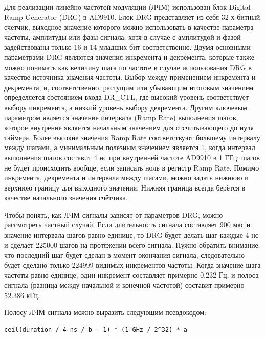 \documentclass[rusmathsym, eqnumwithinsec, amspack, hyperref]{bomgost}
\begin{document}
Для реализации линейно-частотой модуляции (ЛЧМ) использован блок Digital Ramp Generator (DRG) в AD9910. Блок DRG представляет из себя 32-х битный счётчик, выходное значение которого можно использовать в качестве параметра частоты, амплитуды или фазы сигнала, хотя в случае с амплитудой и фазой задействованы только 16 и 14 младших бит соответственно. Двумя основными параметрами DRG являются значения инкремента и декремента, которые также можно понимать как величину шага по частоте в случае использования DRG в качестве источника значения частоты. Выбор между применением инкремента и декремента, и, соответственно, растущим или убывающим итоговым значением определяется состоянием входа DR\_CTL, где высокий уровень соответствует выбору инкремента, а низкий уровень выбору декремента. Другим ключевым параметром является значение интервала (Ramp Rate) выполнения шагов, которое внутренне является начальным значением для отсчитывающего до нуля таймера. Более высокие значения Ramp Rate соответствуют большему интервалу между шагами, а минимальным полезным значением является 1, когда интервал выполнения шагов составит 4 нс при внутренней частоте AD9910 в 1 ГГц; шагов не будет происходить вообще, если записать ноль в регистр Ramp Rate. Помимо инкремента, декремента и интервала между шагами, можно задать нижнюю и верхнюю границу для выходного значения. Нижняя граница всегда берётся в качестве начального значения счётчика.

Чтобы понять, как ЛЧМ сигналы зависят от параметров DRG, можно рассмотреть частный случай. Если длительность сигнала составляет 900 мкс и значение интервала шагов равно единице, то DRG будет делать шаг каждые 4 нс и сделает 225000 шагов на протяжении всего сигнала. Нужно обратить внимание, что последний шаг будет сделан в момент окончания сигнала, следовательно будет сделано только 224999 видимых инкрементов частоты. Когда значение шага частоты равно единице, один инкремент составляет примерно 0.232 Гц, и полоса сигнала (разница между начальной и конечной частотой) составит примерно 52.386 кГц.

Полосу ЛЧМ сигнала можно выразить следующим псевдокодом:

\lstset{
	language=c,
	basicstyle=\scriptsize\ttfamily,
	numbers=left,
	stepnumber=1,
	showstringspaces=false,
	tabsize=4,
	breaklines=true,
	breakatwhitespace=false,
	xleftmargin=.1\textwidth, xrightmargin=.1\textwidth,
	belowskip=1em, aboveskip=1em
}
\begin{lstlisting}
ceil(duration / 4 ns / b - 1) * (1 GHz / 2^32) * a
\end{lstlisting}
\end{document}
